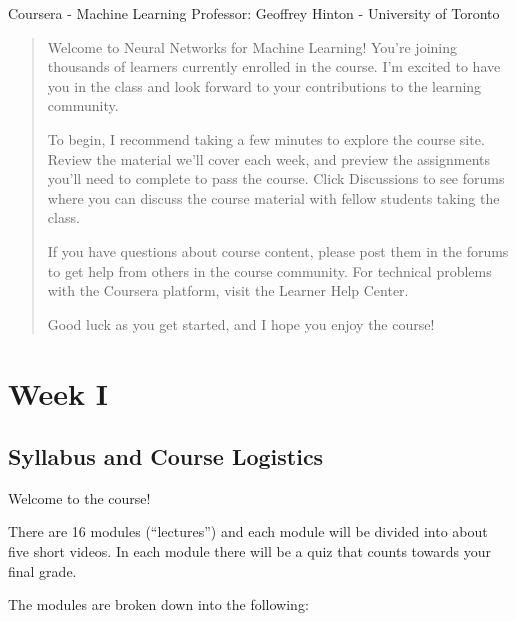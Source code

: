 \textsf{Coursera} - Machine Learning
Professor: Geoffrey Hinton - University of Toronto

\def\r          {`\textsf{R}'}%
\def\octave     {\textsf{GNU Oc\-ta\-ve}}%


\begin{abstract}
Welcome to Neural Networks for Machine Learning! You’re joining thousands of learners currently enrolled in the course. I'm excited to have you in the class and look forward to your contributions to the learning community.

To begin, I recommend taking a few minutes to explore the course site. Review the material we’ll cover each week, and preview the assignments you’ll need to complete to pass the course. Click Discussions to see forums where you can discuss the course material with fellow students taking the class.

If you have questions about course content, please post them in the forums to get help from others in the course community. For technical problems with the Coursera platform, visit the Learner Help Center.

Good luck as you get started, and I hope you enjoy the course!
\end{abstract}


\section{Week I}


\subsection{Syllabus and Course Logistics}

Welcome to the course!

There are 16 modules (``lectures'') and each module will be divided into about five short videos. In each module there will be a quiz that counts towards your final grade.

The modules are broken down into the following:

